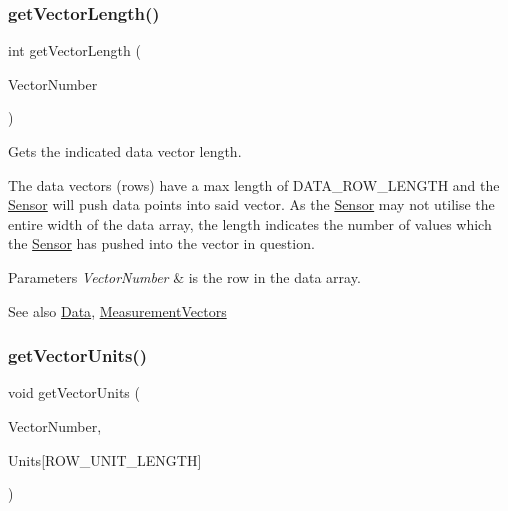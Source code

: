 \subsubsection{\texorpdfstring{getVectorLength()}{getVectorLength()}}
{\footnotesize\ttfamily int get\+Vector\+Length (\begin{DoxyParamCaption}\item[{const \mbox{\hyperlink{_s_p_i___instruction_set_8h_a9d8048399836e11887f85cc8dc3d75d5}{Measurement\+Vectors}}}]{Vector\+Number }\end{DoxyParamCaption})}



Gets the indicated data vector length. 

The data vectors (rows) have a max length of D\+A\+T\+A\+\_\+\+R\+O\+W\+\_\+\+L\+E\+N\+G\+TH and the \mbox{\hyperlink{class_sensor}{Sensor}} will push data points into said vector. As the \mbox{\hyperlink{class_sensor}{Sensor}} may not utilise the entire width of the data array, the length indicates the number of values which the \mbox{\hyperlink{class_sensor}{Sensor}} has pushed into the vector in question. 
\begin{DoxyParams}{Parameters}
{\em Vector\+Number} & is the row in the data array. \\
\hline
\end{DoxyParams}
\begin{DoxySeeAlso}{See also}
\mbox{\hyperlink{struct_data}{Data}}, \mbox{\hyperlink{_s_p_i___instruction_set_8h_a9d8048399836e11887f85cc8dc3d75d5}{Measurement\+Vectors}} 
\end{DoxySeeAlso}
\mbox{\label{class_data_source_af2a2f33b9970ecff75894134498ff2cd}} 
\subsubsection{\texorpdfstring{getVectorUnits()}{getVectorUnits()}}
{\footnotesize\ttfamily void get\+Vector\+Units (\begin{DoxyParamCaption}\item[{const \mbox{\hyperlink{_s_p_i___instruction_set_8h_a9d8048399836e11887f85cc8dc3d75d5}{Measurement\+Vectors}}}]{Vector\+Number,  }\item[{char}]{Units\mbox{[}\+R\+O\+W\+\_\+\+U\+N\+I\+T\+\_\+\+L\+E\+N\+G\+T\+H\mbox{]} }\end{DoxyParamCaption})}



